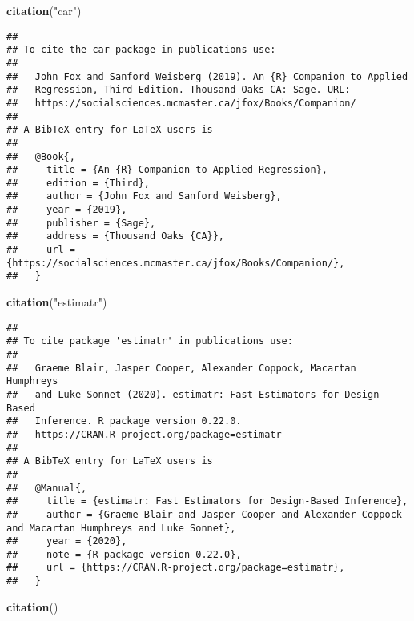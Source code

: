\documentclass[
]{article}
\newenvironment{Shaded}{\begin{snugshade}}{\end{snugshade}}
\newcommand{\KeywordTok}[1]{\textcolor[rgb]{0.13,0.29,0.53}{\textbf{#1}}}
\newcommand{\NormalTok}[1]{#1}
\newcommand{\StringTok}[1]{\textcolor[rgb]{0.31,0.60,0.02}{#1}}
\begin{document}
\begin{Shaded}
\begin{Highlighting}[]
\KeywordTok{citation}\NormalTok{(}\StringTok{"car"}\NormalTok{)}
\end{Highlighting}
\end{Shaded}

\begin{verbatim}
## 
## To cite the car package in publications use:
## 
##   John Fox and Sanford Weisberg (2019). An {R} Companion to Applied
##   Regression, Third Edition. Thousand Oaks CA: Sage. URL:
##   https://socialsciences.mcmaster.ca/jfox/Books/Companion/
## 
## A BibTeX entry for LaTeX users is
## 
##   @Book{,
##     title = {An {R} Companion to Applied Regression},
##     edition = {Third},
##     author = {John Fox and Sanford Weisberg},
##     year = {2019},
##     publisher = {Sage},
##     address = {Thousand Oaks {CA}},
##     url = {https://socialsciences.mcmaster.ca/jfox/Books/Companion/},
##   }
\end{verbatim}

\begin{Shaded}
\begin{Highlighting}[]
\KeywordTok{citation}\NormalTok{(}\StringTok{"estimatr"}\NormalTok{)}
\end{Highlighting}
\end{Shaded}

\begin{verbatim}
## 
## To cite package 'estimatr' in publications use:
## 
##   Graeme Blair, Jasper Cooper, Alexander Coppock, Macartan Humphreys
##   and Luke Sonnet (2020). estimatr: Fast Estimators for Design-Based
##   Inference. R package version 0.22.0.
##   https://CRAN.R-project.org/package=estimatr
## 
## A BibTeX entry for LaTeX users is
## 
##   @Manual{,
##     title = {estimatr: Fast Estimators for Design-Based Inference},
##     author = {Graeme Blair and Jasper Cooper and Alexander Coppock and Macartan Humphreys and Luke Sonnet},
##     year = {2020},
##     note = {R package version 0.22.0},
##     url = {https://CRAN.R-project.org/package=estimatr},
##   }
\end{verbatim}

\begin{Shaded}
\begin{Highlighting}[]
\KeywordTok{citation}\NormalTok{()}
\end{Highlighting}
\end{Shaded}
\end{document}
